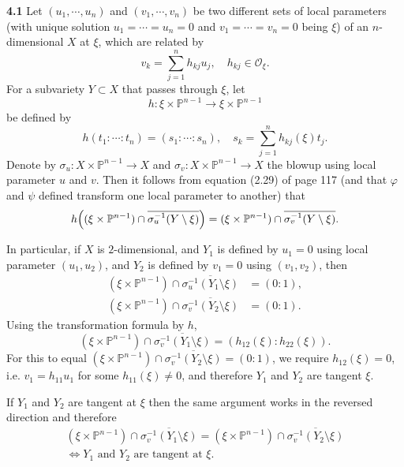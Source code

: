 \documentclass{article}
\makeatletter
\newcommand*{\shifttext}[1]{%
  \settowidth{\@tempdima}{#1}%
  \hspace{-\@tempdima}#1%
}
\newcommand{\plabel}[1]{%
\shifttext{\textbf{#1}\quad}%
}
\newcommand{\prule}{%
\begin{center}%
\hdashrule[0.5ex]{.99\linewidth}{1pt}{1pt 2.5pt}%
\end{center}%
}
\makeatother
\begin{document}
\prule

\plabel{4.1}%
Let $(u_1,\cdots,u_n)$ and $(v_1,\cdots,v_n)$ be two different sets of local parameters (with unique solution $u_1 = \cdots = u_n = 0$ and $v_1 = \cdots = v_n = 0$ being $\xi$) of an $n$-dimensional $X$ at $\xi$, which are related by
\[ v_k = \sum_{j=1}^n h_{kj} u_j, \quad h_{kj} \in \mathcal{O}_\xi. \]
For a subvariety $Y\subset X$ that passes through $\xi$, let
\[ h\colon \xi\times \mathbb{P}^{n-1} \to \xi\times\mathbb{P}^{n-1} \]
be defined by
\[ h(t_1:\cdots:t_n) = (s_1:\cdots:s_n), \quad s_k = \sum_{j=1}^n h_{kj}(\xi) t_j. \]
Denote by $\sigma_u\colon X\times \mathbb{P}^{n-1} \to X$ and $\sigma_v\colon  X\times \mathbb{P}^{n-1} \to X$ the blowup using local parameter $u$ and $v$.
Then it follows from equation (2.29) of page 117 (and that $\varphi$ and $\psi$ defined transform one local parameter to another) that 
\[ h\qty((\xi\times \mathbb{P}^{n-1}) \cap \overline{\sigma_u^{-1}(Y\setminus \xi)}) = (\xi\times \mathbb{P}^{n-1}) \cap \overline{\sigma_v^{-1}(Y\setminus \xi)}. \]
\par
In particular, if $X$ is $2$-dimensional, and $Y_1$ is defined by $u_1 = 0$ using local parameter $(u_1,u_2)$, and $Y_2$ is defined by $v_1 = 0$ using $(v_1,v_2)$, then 
\begin{align*}
    (\xi\times \mathbb{P}^{n-1}) \cap \overline{\sigma_u^{-1}(Y_1\setminus \xi)} &= (0:1), \\
    (\xi\times \mathbb{P}^{n-1}) \cap \overline{\sigma_v^{-1}(Y_2\setminus \xi)} &= (0:1).
\end{align*}
Using the transformation formula by $h$,
\[ (\xi\times \mathbb{P}^{n-1}) \cap \overline{\sigma_v^{-1}(Y_1\setminus \xi)} = (h_{12}(\xi): h_{22}(\xi)). \]
For this to equal $(\xi\times \mathbb{P}^{n-1}) \cap \overline{\sigma_v^{-1}(Y_2\setminus \xi)} = (0:1)$, we require $h_{12}(\xi) = 0$, i.e. $v_1 = h_{11} u_1$ for some $h_{11}(\xi) \neq 0$, and therefore $Y_1$ and $Y_2$ are tangent $\xi$.
\par
If $Y_1$ and $Y_2$ are tangent at $\xi$ then the same argument works in the reversed direction and therefore 
\begin{gather*}
    (\xi\times \mathbb{P}^{n-1}) \cap \overline{\sigma_v^{-1}(Y_1\setminus \xi)} = (\xi\times \mathbb{P}^{n-1}) \cap \overline{\sigma_v^{-1}(Y_2\setminus \xi)} \\
    \Longleftrightarrow \text{$Y_1$ and $Y_2$ are tangent at $\xi$}.
\end{gather*}
\end{document}
